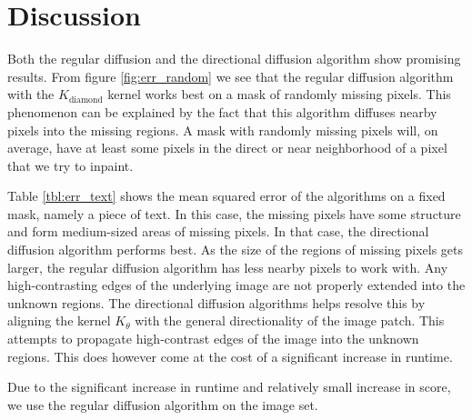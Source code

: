 \section{Discussion}
\label{sec:discussion}

Both the regular diffusion and the directional diffusion algorithm show promising results. From figure \ref{fig:err_random} we see that the regular diffusion algorithm with the $K_{\text{diamond}}$ kernel works best on a mask of randomly missing pixels. This phenomenon can be explained by the fact that this algorithm diffuses nearby pixels into the missing regions. A mask with randomly missing pixels will, on average, have at least some pixels in the direct or near neighborhood of a pixel that we try to inpaint.

Table \ref{tbl:err_text} shows the mean squared error of the algorithms on a fixed mask, namely a piece of text. In this case, the missing pixels have some structure and form medium-sized areas of missing pixels. In that case, the directional diffusion algorithm performs best. As the size of the regions of missing pixels gets larger, the regular diffusion algorithm has less nearby pixels to work with. Any high-contrasting edges of the underlying image are not properly extended into the unknown regions. The directional diffusion algorithms helps resolve this by aligning the kernel  $K_{\theta}$ with the general directionality of the image patch. This attempts to propagate high-contrast edges of the image into the unknown regions. This does however come at the cost of a significant increase in runtime.

Due to the significant increase in runtime and relatively small increase in score, we use the regular diffusion algorithm on the image set.